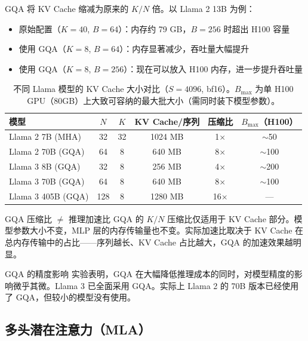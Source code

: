 GQA 将 KV Cache 缩减为原来的 $K/N$ 倍。以 Llama 2 13B 为例：

\begin{itemize}
    \item 原始配置（$K=40$, $B=64$）：内存约 79 GB，$B=256$ 时超出 H100 容量
    \item 使用 GQA（$K=8$, $B=64$）：内存显著减少，吞吐量大幅提升
    \item 使用 GQA（$K=8$, $B=256$）：现在可以放入 H100 内存，进一步提升吞吐量
\end{itemize}

\begin{table}[H]
\centering
\begin{tabular}{lccccc}
\toprule
\textbf{模型} & \textbf{$N$} & \textbf{$K$} & \textbf{KV Cache/序列} & \textbf{压缩比} & \textbf{$B_\text{max}$（H100）} \\
\midrule
Llama 2 7B (MHA) & 32 & 32 & 1024 MB & 1$\times$ & $\sim$50 \\
Llama 2 70B (GQA) & 64 & 8 & 640 MB & 8$\times$ & $\sim$100 \\
Llama 3 8B (GQA) & 32 & 8 & 256 MB & 4$\times$ & $\sim$200 \\
Llama 3 70B (GQA) & 64 & 8 & 640 MB & 8$\times$ & $\sim$100 \\
Llama 3 405B (GQA) & 128 & 8 & 1280 MB & 16$\times$ & --- \\
\bottomrule
\end{tabular}
\caption{不同 Llama 模型的 KV Cache 大小对比（$S=4096$, bf16）。$B_\text{max}$ 为单 H100 GPU（80GB）上大致可容纳的最大批大小（需同时装下模型参数）。}
\end{table}

\begin{warningbox}{GQA 压缩比 $\neq$ 推理加速比}
GQA 的 $K/N$ 压缩比仅适用于 KV Cache 部分。模型参数大小不变，MLP 层的内存传输量也不变。实际加速比取决于 KV Cache 在总内存传输中的占比——序列越长、KV Cache 占比越大，GQA 的加速效果越明显。
\end{warningbox}

\begin{knowledgebox}{GQA 的精度影响}
实验表明，GQA 在大幅降低推理成本的同时，对模型精度的影响微乎其微。Llama 3 已全面采用 GQA。实际上 Llama 2 的 70B 版本已经使用了 GQA，但较小的模型没有使用。
\end{knowledgebox}

\subsection{多头潜在注意力（MLA）}

